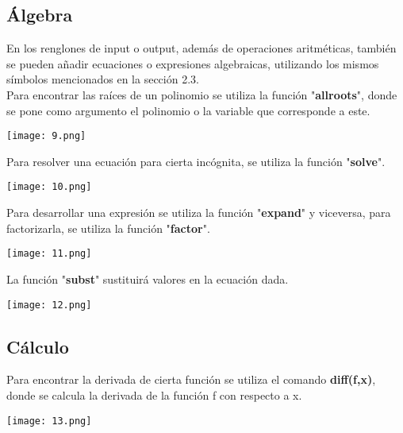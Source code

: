\documentclass[12pt]{article}
\begin{document}
\subsection{Álgebra}

En los renglones de input o output, además de operaciones aritméticas, también se pueden añadir ecuaciones o expresiones algebraicas, utilizando los mismos símbolos mencionados en la sección 2.3.  \\

Para encontrar las raíces de un polinomio se utiliza la función "\textbf{allroots}", donde se pone como argumento el polinomio o la variable que corresponde a este. \\

\begin{center}
 \texttt{[image: 9.png]}
 \end{center}

Para resolver una ecuación para cierta incógnita, se utiliza la función "\textbf{solve}".\\

\begin{center}
 \texttt{[image: 10.png]}
 \end{center}

Para desarrollar una expresión se utiliza la función "\textbf{expand}" y viceversa, para factorizarla, se utiliza la función "\textbf{factor}".  \\

\begin{center}
 \texttt{[image: 11.png]}
 \end{center}

\clearpage
La función "\textbf{subst}" sustituirá valores en la ecuación dada. 

\begin{center}
 \texttt{[image: 12.png]}
 \end{center}

\subsection{Cálculo}

Para encontrar la derivada de cierta función se utiliza el comando \textbf{diff(f,x)}, donde se calcula la derivada de la función f con respecto a x. \\

\begin{center}
 \texttt{[image: 13.png]}
 \end{center}
\end{document}
